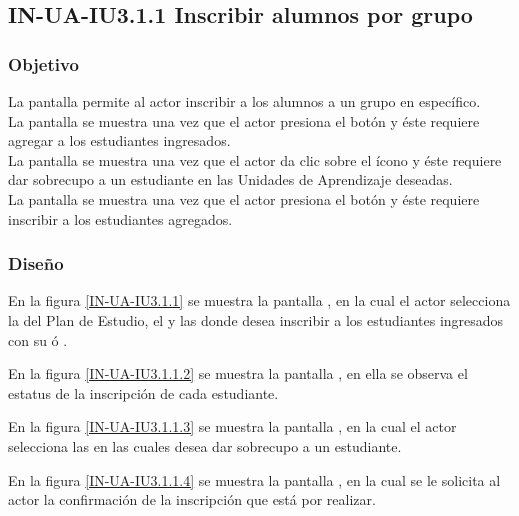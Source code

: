 \subsection{IN-UA-IU3.1.1 Inscribir alumnos por grupo}

\subsubsection{Objetivo}

	La pantalla  permite al actor inscribir a los alumnos a un grupo en específico.\\

	La pantalla  se muestra una vez que el actor presiona el botón  y éste requiere agregar a los estudiantes ingresados.\\
	
	La pantalla  se muestra una vez que el actor da clic sobre el ícono {\IUPila} y éste requiere dar sobrecupo a un estudiante en las Unidades de Aprendizaje deseadas.\\
	
	La pantalla  se muestra una vez que el actor presiona el botón  y éste requiere inscribir a los estudiantes agregados.

\subsubsection{Diseño}

    En la figura \ref{IN-UA-IU3.1.1} se muestra la pantalla , en la cual el actor selecciona la  del Plan de Estudio, el  y las  donde desea inscribir a los estudiantes ingresados con su  ó .
    
    En la figura \ref{IN-UA-IU3.1.1.2} se muestra la pantalla , en ella se observa el estatus de la inscripción de cada estudiante.
    
    En la figura \ref{IN-UA-IU3.1.1.3} se muestra la pantalla , en la cual el actor selecciona las  en las cuales desea dar sobrecupo a un estudiante.
    
    En la figura \ref{IN-UA-IU3.1.1.4} se muestra la pantalla , en la cual se le solicita al actor la confirmación de la inscripción que está por realizar.
    
   
